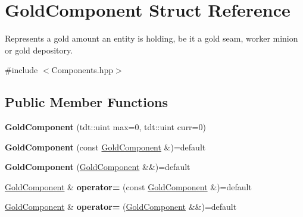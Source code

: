 \hypertarget{struct_gold_component}{}\section{Gold\+Component Struct Reference}
\label{struct_gold_component}


Represents a gold amount an entity is holding, be it a gold seam, worker minion or gold depository.  




{\ttfamily \#include $<$Components.\+hpp$>$}

\subsection*{Public Member Functions}
\begin{DoxyCompactItemize}
\item 
{\bfseries Gold\+Component} (tdt\+::uint max=0, tdt\+::uint curr=0)\hypertarget{struct_gold_component_ab8447bb12a8325cf3804f5e61a15844b}{}\label{struct_gold_component_ab8447bb12a8325cf3804f5e61a15844b}

\item 
{\bfseries Gold\+Component} (const \hyperlink{struct_gold_component}{Gold\+Component} \&)=default\hypertarget{struct_gold_component_a5d55c80ab002d3c5797699a9c46ede1e}{}\label{struct_gold_component_a5d55c80ab002d3c5797699a9c46ede1e}

\item 
{\bfseries Gold\+Component} (\hyperlink{struct_gold_component}{Gold\+Component} \&\&)=default\hypertarget{struct_gold_component_af33ae4ab76a4b97c46716ff075bab41c}{}\label{struct_gold_component_af33ae4ab76a4b97c46716ff075bab41c}

\item 
\hyperlink{struct_gold_component}{Gold\+Component} \& {\bfseries operator=} (const \hyperlink{struct_gold_component}{Gold\+Component} \&)=default\hypertarget{struct_gold_component_af1f351ee46d01fa436f6d01dba41f00b}{}\label{struct_gold_component_af1f351ee46d01fa436f6d01dba41f00b}

\item 
\hyperlink{struct_gold_component}{Gold\+Component} \& {\bfseries operator=} (\hyperlink{struct_gold_component}{Gold\+Component} \&\&)=default\hypertarget{struct_gold_component_a64718b76ee7ef30300b7df4703c3df0b}{}\label{struct_gold_component_a64718b76ee7ef30300b7df4703c3df0b}

\end{DoxyCompactItemize}
